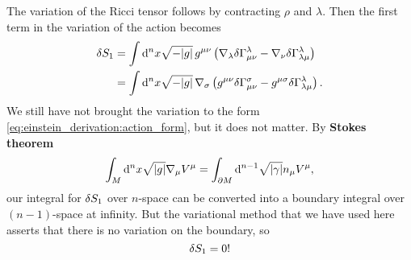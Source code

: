 The variation of the Ricci tensor follows by contracting $\rho$ and $\lambda$. 
Then the first term in the variation of the action becomes
\begin{equation}
\begin{split}
	\delta S_1 &= \int \mathop{}\!\mathrm{d}^n x \sqrt{-\lvert g \rvert} \, g^{\mu \nu} \left( \nabla_\lambda \delta \Gamma^\lambda_{\mu \nu} - \nabla_\nu \delta \Gamma^\lambda_{\lambda \mu} \right) \\
	                &= \int \mathop{}\!\mathrm{d}^n x \sqrt{-\lvert g \rvert} \, \nabla_\sigma \left( g^{\mu \nu} \delta \Gamma^\sigma_{\mu \nu} - g^{\mu \sigma} \delta \Gamma^\lambda_{\lambda \mu} \right) . \\
	\label{eq:einstein_derivation:ds1_intermediate}
\end{split}
\end{equation}
We still have not brought the variation to the form \eqref{eq:einstein_derivation:action_form}, but it does not matter.
By \textbf{Stokes theorem} \cite[equation 3.35]{ref:carroll}
\begin{equation}
	\int_M \mathop{}\!\mathrm{d}^n x \sqrt{\lvert g \rvert} \nabla_\mu V^\mu = \int_{\partial M} \mathop{}\!\mathrm{d}^{n-1} \sqrt{\lvert \gamma \rvert} n_\mu V^\mu ,
\end{equation}
our integral for $\delta S_1$ over $n$-space can be converted into a boundary integral over $(n-1)$-space at infinity.
But the variational method that we have used here asserts that there is no variation on the boundary, so
\begin{equation}
	\delta S_1 = 0 !
\end{equation}

